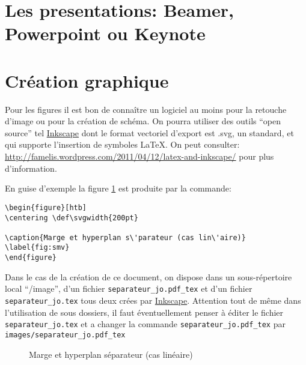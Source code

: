 
\section{Les presentations: Beamer, Powerpoint ou Keynote}


\section{Cr\'eation graphique}
Pour les figures il est bon de connaître un
logiciel au moins pour la retouche d'image ou pour la création de schéma.
On pourra utiliser des outils ``open source'' tel  \href{http://inkscape.org/}{Inkscape}
 dont le format vectoriel d'export est .svg, un standard, et qui supporte l'insertion de symboles \LaTeX. 
 On peut consulter: \url{http://famelis.wordpress.com/2011/04/12/latex-and-inkscape/}
pour plus d'information.

En guise d'exemple la figure \ref{fig:smv} est produite par la commande:
\begin{lstlisting}
\begin{figure}[htb] 
\centering \def\svgwidth{200pt} 
 
\caption{Marge et hyperplan s\'parateur (cas lin\'aire)} 
\label{fig:smv}
\end{figure}
\end{lstlisting}
Dans le cas de la création de ce document, on dispose dans un sous-répertoire local ``/image'',
d'un fichier \lstinline+separateur_jo.pdf_tex+ et d'un fichier \lstinline+separateur_jo.tex+
tous deux crées par \href{http://inkscape.org/}{Inkscape}.
Attention tout de m\^eme dans l'utilisation de sous dossiers,
il faut éventuellement penser \`a éditer le fichier
\lstinline+separateur_jo.tex+
et a changer la commande \lstinline+separateur_jo.pdf_tex+
par \lstinline+images/separateur_jo.pdf_tex+


\begin{figure}[htb] 
\centering \def\svgwidth{400pt} 
 
\caption{Marge et hyperplan séparateur (cas linéaire)} 
\label{fig:smv}
\end{figure}



